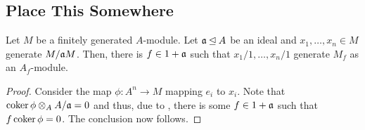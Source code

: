 \subsection*{Place This Somewhere}

\begin{lemma}
    Let $M$ be a finitely generated $A$-module. Let $\mathfrak a\unlhd A$ be an ideal and $x_1,\dots,x_n\in M$ generate $M/\mathfrak a M$. Then, there is $f\in 1 + \mathfrak a$ such that $x_1/1,\dots,x_n/1$ generate $M_f$ as an $A_f$-module.
\end{lemma}
\begin{proof}
    Consider the map $\phi: A^n\to M$ mapping $e_i$ to $x_i$. Note that $\operatorname{coker} \phi\otimes_A A/\mathfrak a = 0$ and thus, due to , there is some $f\in 1 + \mathfrak a$ such that $f\operatorname{coker}\phi = 0$. The conclusion now follows.
\end{proof}

